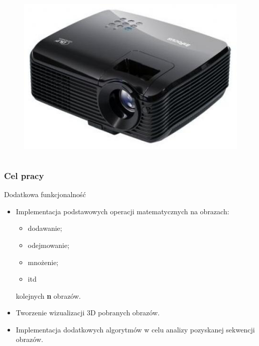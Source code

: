 \documentclass{beamer}
\begin{document}
\begin{frame}
\begin{columns}
\begin{column}{6cm}
      \begin{figure}[htb]
	\begin{center}
	  \includegraphics[angle=0,scale=0.2]{projektor.jpg}
	\end{center}
      \end{figure}
    \end{column}
    
  \end{columns}
  
\end{frame}


\begin{frame}\frametitle{Cel pracy}
  \begin{block}{Dodatkowa funkcjonalność}
    \begin{itemize}
    \item Implementacja podstawowych operacji matematycznych na obrazach:
      \begin{itemize}
      \item dodawanie;
      \item odejmowanie;
      \item mnożenie;
      \item itd
      \end{itemize}
	kolejnych \textbf{n} obrazów.\pause
    \item Tworzenie wizualizacji 3D pobranych obrazów.\pause
    \item Implementacja dodatkowych algorytmów w celu analizy pozyskanej sekwencji obrazów.
    \end{itemize}
  \end{block}
\end{frame}
\end{document}
